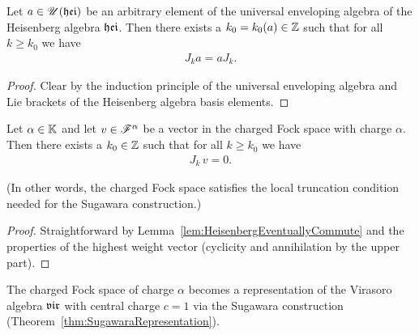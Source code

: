 \begin{lemma}
  \label{lem:HeisenbergEventuallyCommute}
  \leanok
  Let $a \in \mathscr{U}(\mathfrak{hei})$ be an arbitrary element of the universal enveloping
  algebra of the Heisenberg algebra $\mathfrak{hei}$. Then there exists a $k_0=k_0(a) \in \mathbb{Z}$
  such that for all $k \ge k_0$ we have
  \begin{align*}
    J_k a = a J_k .
  \end{align*}
\end{lemma}
\begin{proof}
  \leanok
  Clear by the induction principle of the universal enveloping algebra and
  Lie brackets of the Heisenberg algebra basis elements.
\end{proof}

\begin{lemma}
  \label{lem:TruncationForChargedFockSpace}
  \leanok
  Let $\alpha \in \mathbb{K}$ and let $v \in \mathscr{F}^{\alpha}$ be a vector in
  the charged Fock space with charge $\alpha$.
  Then there exists a $k_0 \in \mathbb{Z}$ such that for all $k \ge k_0$ we have
  \begin{align*}
    J_k \, v = 0 .
  \end{align*}

  (In other words, the charged Fock space satisfies the local truncation condition
  \tagHeiTrunc{} needed for the Sugawara construction.)
\end{lemma}
\begin{proof}
  \leanok
  Straightforward by Lemma~\ref{lem:HeisenbergEventuallyCommute}
  and the properties of the highest weight vector
  (cyclicity and annihilation by the upper part).
\end{proof}

\begin{definition}
  \label{def:ChargedFockSpaceSugawara}
  \leanok
  The charged Fock space of charge $\alpha$
  becomes a representation of the Virasoro algebra
  $\mathfrak{vir}$ with central charge $c = 1$ via the Sugawara construction
  (Theorem~\ref{thm:SugawaraRepresentation}).
\end{definition}

